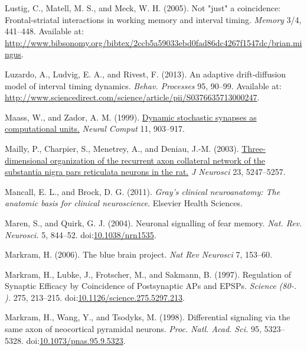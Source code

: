 \documentclass[
  11pt,
  a4paper,
]{scrbook}
\newlength{\cslhangindent}
\newenvironment{CSLReferences}[2] %
 {\begin{list}{}{%
  \setlength{\itemindent}{0pt}
  \setlength{\leftmargin}{0pt}
  \setlength{\parsep}{0pt}
  \ifodd #1
   \setlength{\leftmargin}{\cslhangindent}
   \setlength{\itemindent}{-1\cslhangindent}
  \fi
  \setlength{\itemsep}{#2\baselineskip}}}
 {\end{list}}
\begin{document}
\begin{CSLReferences}{1}{1}
Lustig, C., Matell, M. S., and Meck, W. H. (2005). {Not "just" a
coincidence: Frontal-striatal interactions in working memory and
interval timing}. \emph{Memory} 3/4, 441--448. Available at:
\url{http://www.bibsonomy.org/bibtex/2ccb5a59033ebd0fad86dc4267f1547dc/brian.mingus}.

Luzardo, A., Ludvig, E. A., and Rivest, F. (2013). {An adaptive
drift-diffusion model of interval timing dynamics}. \emph{Behav.
Processes} 95, 90--99. Available at:
\url{http://www.sciencedirect.com/science/article/pii/S0376635713000247}.

Maass, W., and Zador, A. M. (1999).
\href{https://www.ncbi.nlm.nih.gov/pubmed/10226188}{Dynamic stochastic
synapses as computational units.} \emph{Neural Comput} 11, 903--917.

Mailly, P., Charpier, S., Menetrey, A., and Deniau, J.-M. (2003).
\href{https://www.ncbi.nlm.nih.gov/pubmed/12832549}{Three-dimensional
organization of the recurrent axon collateral network of the substantia
nigra pars reticulata neurons in the rat.} \emph{J Neurosci} 23,
5247--5257.

Mancall, E. L., and Brock, D. G. (2011). \emph{Gray's clinical
neuroanatomy: The anatomic basis for clinical neuroscience}. Elsevier
Health Sciences.

Maren, S., and Quirk, G. J. (2004). {Neuronal signalling of fear
memory.} \emph{Nat. Rev. Neurosci.} 5, 844--52.
doi:\href{https://doi.org/10.1038/nrn1535}{10.1038/nrn1535}.

Markram, H. (2006). The blue brain project. \emph{Nat Rev Neurosci} 7,
153--60.

Markram, H., Lubke, J., Frotscher, M., and Sakmann, B. (1997).
{Regulation of Synaptic Efficacy by Coincidence of Postsynaptic APs and
EPSPs}. \emph{Science (80-. ).} 275, 213--215.
doi:\href{https://doi.org/10.1126/science.275.5297.213}{10.1126/science.275.5297.213}.

Markram, H., Wang, Y., and Tsodyks, M. (1998). {Differential signaling
via the same axon of neocortical pyramidal neurons}. \emph{Proc. Natl.
Acad. Sci.} 95, 5323--5328.
doi:\href{https://doi.org/10.1073/pnas.95.9.5323}{10.1073/pnas.95.9.5323}.


\end{CSLReferences}
\end{document}

